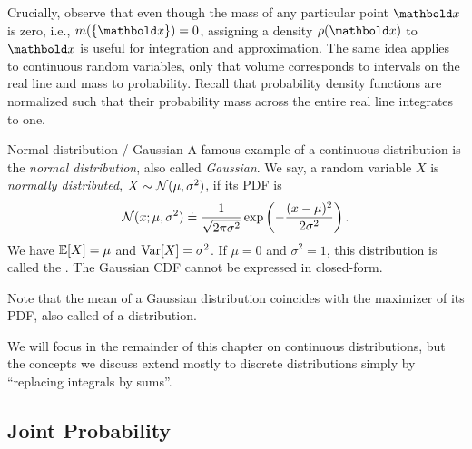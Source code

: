 Crucially, observe that even though the mass of any particular point $\vx$ is zero, i.e., ${m(\{\vx\}) = 0}$, assigning a density $\rho(\vx)$ to $\vx$ is useful for integration and approximation.
The same idea applies to continuous random variables, only that volume corresponds to intervals on the real line and mass to probability.
Recall that probability density functions are normalized such that their probability mass across the entire real line integrates to one.

\begin{marginfigure}[10\baselineskip]
	\caption{PDF of the standard normal distribution. Observe that the PDF is symmetric around the mode.}
\end{marginfigure}

\begin{ex}{Normal distribution / Gaussian}{}%
  A famous example of a continuous distribution is the \emph{normal distribution}, also called \emph{Gaussian}.
  We say, a random variable $X$ is \emph{normally distributed}, ${X \sim \N{\mu}{\sigma^2}}$, if its PDF is \begin{align}
    \N[x]{\mu}{\sigma^2} \defeq \frac{1}{\sqrt{2\pi\sigma^2}} \exp\left(-\frac{(x - \mu)^2}{2 \sigma^2}\right). \label{eq:univ_normal}
  \end{align}
  We have ${\E{X} = \mu}$ and ${\Var{X} = \sigma^2}$. If ${\mu = 0}$ and ${\sigma^2 = 1}$, this distribution is called the .
  The Gaussian CDF cannot be expressed in closed-form.

  Note that the mean of a Gaussian distribution coincides with the maximizer of its PDF, also called  of a distribution.
\end{ex}

We will focus in the remainder of this chapter on continuous distributions, but the concepts we discuss extend mostly to discrete distributions simply by ``replacing integrals by sums''.

\subsection{Joint Probability}

